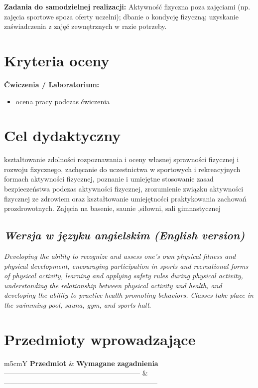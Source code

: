\documentclass[12pt, a4paper]{article}
\newcommand{\thdrule}{\noalign{\global\setlength{\extrarowheight}{0pt}}}
\newcommand{\thdend}{\noalign{\global\setlength{\extrarowheight}{3pt}}}
\begin{document}
\vspace{4pt}
\noindent\textbf{Zadania do samodzielnej realizacji:} Aktywność fizyczna poza zajęciami (np. zajęcia sportowe spoza oferty uczelni); dbanie o kondycję fizyczną; uzyskanie zaświadczenia z zajęć zewnętrznych w razie potrzeby.

\section{Kryteria oceny}

\textbf{Ćwiczenia / Laboratorium:}
\begin{itemize}
  \item ocena pracy podczas ćwiczenia
\end{itemize}


\section{Cel dydaktyczny}

kształtowanie zdolności rozpoznawania i oceny własnej sprawności fizycznej i rozwoju fizycznego, zachęcanie do uczestnictwa w sportowych i rekreacyjnych formach aktywności fizycznej, poznanie i umiejętne stosowanie zasad bezpieczeństwa podczas aktywności fizycznej, zrozumienie związku aktywności fizycznej ze zdrowiem oraz kształtowanie umiejętności praktykowania zachowań prozdrowotnych. Zajęcia na basenie, saunie ,siłowni, sali gimnastycznej

\subsection*{\textit{Wersja w języku angielskim (English version)}}

\textit{Developing the ability to recognize and assess one’s own physical fitness and physical development, encouraging participation in sports and recreational forms of physical activity, learning and applying safety rules during physical activity, understanding the relationship between physical activity and health, and developing the ability to practice health-promoting behaviors. Classes take place in the swimming pool, sauna, gym, and sports hall.}


\section{Przedmioty wprowadzające}

{\scriptsize
\begin{tabularx}{\textwidth}{m{5cm}Y}
\thdrule\toprule
{} {\color{white}\textbf{Przedmiot}} & {\color{white}\textbf{Wymagane zagadnienia}} \\
\midrule\thdend
   ----------------------------------------------------------- & ------------------------------------------------------------------ \\
\bottomrule
\end{tabularx}}
\end{document}
